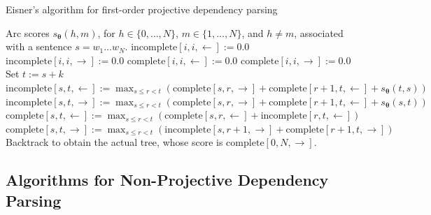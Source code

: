 \begin{algorithm}[h!]
   \caption{Eisner's algorithm for first-order projective dependency parsing\label{alg:eisner}}
\begin{algorithmic}[1]
    Arc scores $s_{\boldsymbol{\theta}}(h,m)$, for $h \in \{0,\ldots,N\}$, 
   $m \in \{1,\ldots,N\}$, and $h \ne m$, associated with a sentence $s=w_1\ldots w_N$.
   \STATE {}
	\STATE {}
	\STATE $\mathrm{incomplete}[i,i,\leftarrow] := 0.0$
	\STATE $\mathrm{incomplete}[i,i,\rightarrow] := 0.0$
	\STATE
	\STATE {}
	\STATE $\mathrm{complete}[i,i,\leftarrow] := 0.0$
	\STATE $\mathrm{complete}[i,i,\rightarrow] := 0.0$
	\ENDFOR
	\STATE
	\STATE {}
	\STATE Set $t := s + k$ 
	\STATE
	\STATE {}
	\STATE $\mathrm{incomplete}[s,t,\leftarrow] := \max_{s \le r < t} (\mathrm{complete}[s,r,\rightarrow] + \mathrm{complete}[r+1,t,\leftarrow] + s_{\boldsymbol{\theta}}(t,s)) $
	\STATE $\mathrm{incomplete}[s,t,\rightarrow] := \max_{s \le r < t} (\mathrm{complete}[s,r,\rightarrow] + \mathrm{complete}[r+1,t,\leftarrow] + s_{\boldsymbol{\theta}}(s,t))$
	\STATE
	\STATE {}
	\STATE $\mathrm{complete}[s,t,\leftarrow] := \max_{s \le r < t} (\mathrm{complete}[s,r,\leftarrow] + \mathrm{incomplete}[r,t,\leftarrow])$
	\STATE $\mathrm{complete}[s,t,\rightarrow] := \max_{s \le r < t} (\mathrm{incomplete}[s,r+1,\rightarrow] + \mathrm{complete}[r+1,t,\rightarrow])$
	\ENDFOR
	\ENDFOR
	\STATE
	\STATE {}
	\STATE Backtrack to obtain the actual tree, whose score is $\mathrm{complete}[0,N,\rightarrow]$.
\end{algorithmic}
\end{algorithm}


\subsection{Algorithms for Non-Projective Dependency Parsing}

